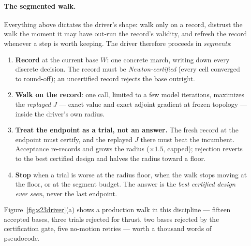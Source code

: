 \paragraph{The segmented walk.} Everything above dictates the
driver's shape: walk only on a record, distrust the walk the moment
it may have out-run the record's validity, and refresh the record
whenever a step is worth keeping. The driver therefore proceeds in
\emph{segments}:

\begin{enumerate}
\item \textbf{Record} at the current base $W$: one concrete march,
  writing down every discrete decision. The record must be
  \emph{Newton-certified} (every cell converged to round-off); an
  uncertified record rejects the base outright.
\item \textbf{Walk on the record}: one  call,
  limited to a few model iterations, maximizes the \emph{replayed}
  $J$ --- exact value and exact adjoint gradient at frozen topology
  --- inside the driver's own radius.
\item \textbf{Treat the endpoint as a trial, not an answer.} The
  fresh record at the endpoint must certify, and the replayed $J$
  there must beat the incumbent. Acceptance re-records and grows
  the radius ($\times 1.5$, capped); rejection reverts to the best
  certified design and halves the radius toward a floor.
\item \textbf{Stop} when a trial is worse at the radius floor, when
  the walk stops moving at the floor, or at the segment budget. The
  answer is the \emph{best certified design ever seen}, never the
  last endpoint.
\end{enumerate}

Figure~\ref{fig:s23driver}(a) shows a production walk in this
discipline --- fifteen accepted bases, three trials rejected for
thrust, two bases rejected by the certification gate, five
no-motion retries --- worth a thousand words of pseudocode.

